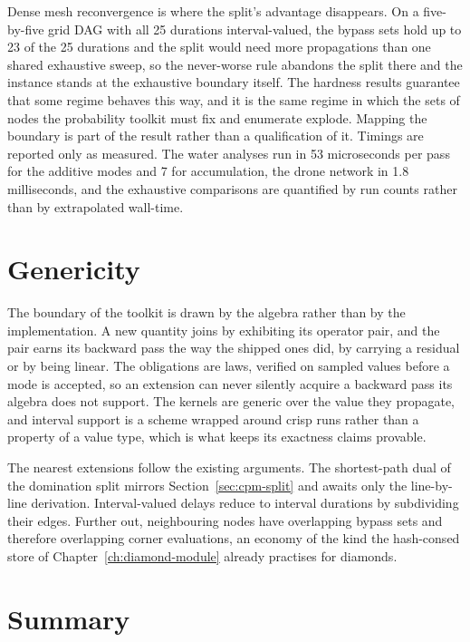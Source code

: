 \documentclass[12pt]{report}
\begin{document}
Dense mesh reconvergence is where the split's advantage disappears. On a
five-by-five grid DAG with all 25 durations interval-valued, the bypass sets
hold up to 23 of the 25 durations and the split would need more propagations
than one shared exhaustive sweep, so the never-worse rule abandons the split
there and the instance stands at the exhaustive boundary itself. The hardness
results guarantee that some regime behaves this way, and it is the same
regime in which the sets of nodes the probability toolkit must fix and
enumerate explode. Mapping the boundary is part of the result rather than a
qualification of it. Timings are reported only as measured. The water
analyses run in 53 microseconds per pass for the additive modes and 7 for
accumulation, the drone network in 1.8 milliseconds, and the exhaustive
comparisons are quantified by run counts rather than by extrapolated
wall-time.

\section{Genericity}
\label{sec:cpm-genericity}

The boundary of the toolkit is drawn by the algebra rather than by the
implementation. A new quantity joins by exhibiting its operator pair, and
the pair earns its backward pass the way the shipped ones did, by carrying
a residual or by being linear. The obligations are laws, verified on
sampled values before a mode is accepted, so an extension can never
silently acquire a backward pass its algebra does not support. The kernels
are generic over the value they propagate, and interval support is a scheme
wrapped around crisp runs rather than a property of a value type, which is
what keeps its exactness claims provable.

The nearest extensions follow the existing arguments. The shortest-path
dual of the domination split mirrors Section~\ref{sec:cpm-split} and awaits
only the line-by-line derivation. Interval-valued delays reduce to interval
durations by subdividing their edges. Further out, neighbouring nodes have
overlapping bypass sets and therefore overlapping corner evaluations, an
economy of the kind the hash-consed store of Chapter~\ref{ch:diamond-module}
already practises for diamonds.

\section{Summary}
\label{sec:cpm-summary}
\end{document}

